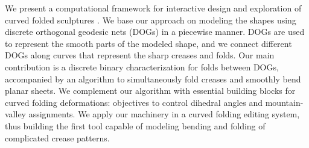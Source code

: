 We present a computational framework 
for 
interactive design and 
exploration of curved folded sculptures .
%
%
We base our approach on modeling the shapes using discrete orthogonal geodesic nets (DOGs) in a piecewise manner. DOGs are used to represent the smooth parts of the modeled shape, and we connect different DOGs along curves that represent the sharp creases and folds. 
Our main 
contribution is a discrete binary characterization for folds between DOGs, accompanied by an algorithm to simultaneously fold creases and smoothly bend planar sheets. We complement our algorithm with essential building blocks for curved folding deformations: objectives to control dihedral angles and mountain-valley assignments. We apply our machinery in a curved folding editing system, thus building the first tool capable of modeling bending and folding of complicated crease patterns.

